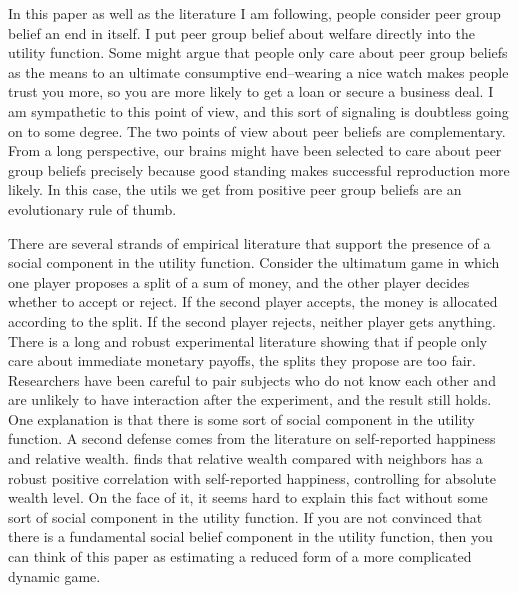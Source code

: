In this paper as well as the literature I am following, people consider peer group belief an end in itself.  I put peer group belief about welfare directly into the utility function.  Some might argue that people only care about peer group beliefs as the means to an ultimate consumptive end--wearing a nice watch makes people trust you more, so you are more likely to get a loan or secure a business deal.  I am sympathetic to this point of view, and this sort of signaling is doubtless going on to some degree.  The two points of view about peer beliefs are complementary.  From a long perspective, our brains might have been selected to care about peer group beliefs precisely because good standing makes successful reproduction more likely. In this case, the utils we get from positive peer group beliefs are an evolutionary rule of thumb.\citep{RobsonSamuelson2010}

There are several strands of empirical literature that support the presence of a social component in the utility function.  Consider the ultimatum game in which one player proposes a split of a sum of money, and the other player decides whether to accept or reject.  If the second player accepts, the money is allocated according to the split. If the second player rejects, neither player gets anything.  There is a long and robust experimental literature showing that if people only care about immediate monetary payoffs, the splits they propose are too fair.  Researchers have been careful to pair subjects who do not know each other and are unlikely to have interaction after the experiment, and the result still holds.  One explanation is that there is some sort of social component in the utility function. \citep{FehrSchmidt1999,BoltonOckenfels2000}  A second defense comes from the literature on self-reported happiness and relative wealth.  \citet{Luttmer2004} finds that relative wealth compared with neighbors has a robust positive correlation  with self-reported happiness, controlling for absolute wealth level.  On the face of it, it seems hard to explain this fact without some sort of social component in the utility function.  If you are not convinced that there is a fundamental social belief component in the utility function, then you can think of this paper as estimating a reduced form of a more complicated dynamic game.

